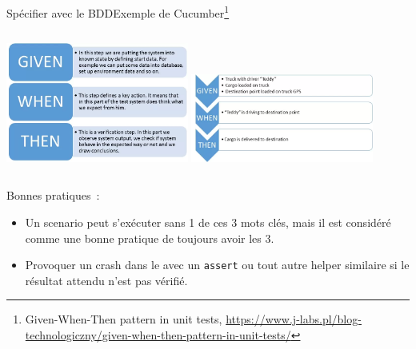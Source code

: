 \documentclass{beamer}
\begin{document}
    \begin{frame}{Spécifier avec le BDD}{Exemple de Cucumber\footnote{Given-When-Then pattern in unit tests, \url{https://www.j-labs.pl/blog-technologiczny/given-when-then-pattern-in-unit-tests/}}}
        \transdissolve
        \begin{columns}
            \centering
            \includegraphics[width=6cm]{image/given-when-then}
            \centering
            \includegraphics[width=6cm]{image/given-when-then-exemple}
        \end{columns}
        Bonnes pratiques~:
        \begin{itemize}
            \item Un scenario peut s'exécuter sans 1 de ces 3 mots clés, mais il est considéré comme une bonne pratique de toujours avoir les 3.

            \item Provoquer un crash dans le  avec un \lstinline{assert} ou tout autre helper similaire si le résultat attendu n'est pas vérifié.
        \end{itemize}
    \end{frame}
\end{document}
